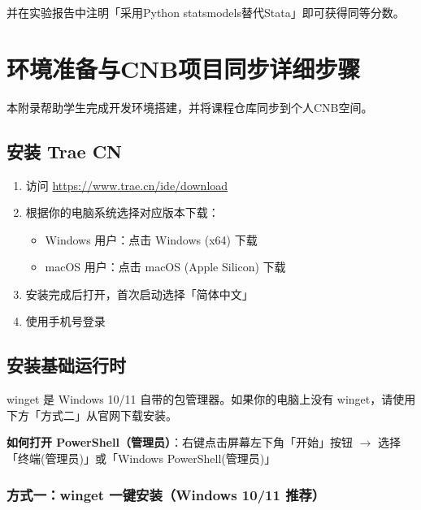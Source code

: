 并在实验报告中注明「采用Python statsmodels替代Stata」即可获得同等分数。


\chapter{环境准备与CNB项目同步详细步骤}

本附录帮助学生完成开发环境搭建，并将课程仓库同步到个人CNB空间。

\section{安装 Trae CN}

\begin{enumerate}[leftmargin=2em]
  \item 访问 \url{https://www.trae.cn/ide/download}
  \item 根据你的电脑系统选择对应版本下载：
  \begin{itemize}[leftmargin=1em]
    \item Windows 用户：点击 Windows (x64) 下载
    \item macOS 用户：点击 macOS (Apple Silicon) 下载
  \end{itemize}
  \item 安装完成后打开，首次启动选择「简体中文」
  \item 使用手机号登录
\end{enumerate}

\section{安装基础运行时}

winget 是 Windows 10/11 自带的包管理器。如果你的电脑上没有 winget，请使用下方「方式二」从官网下载安装。

\textbf{如何打开 PowerShell（管理员）}：右键点击屏幕左下角「开始」按钮 $\rightarrow$ 选择「终端(管理员)」或「Windows PowerShell(管理员)」

\subsection{方式一：winget 一键安装（Windows 10/11 推荐）}

